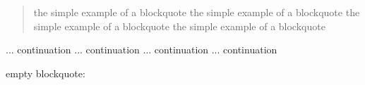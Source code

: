 \begin{quote}
the simple example of a blockquote the simple example of a blockquote the simple example of a blockquote the simple example of a blockquote \end{quote}
... continuation ... continuation ... continuation ... continuation

empty blockquote\+:

\begin{quote}


\end{quote}
